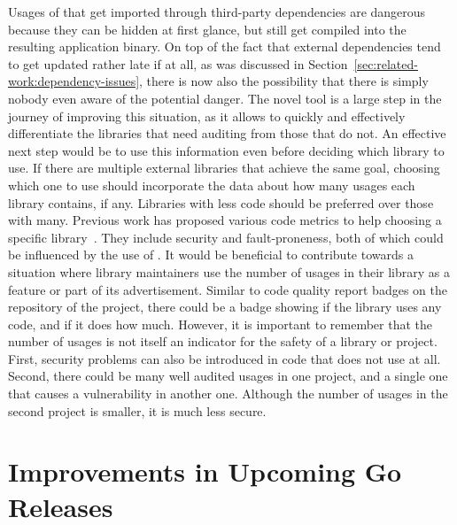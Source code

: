 Usages of \unsafe{} that get imported through third-party dependencies are dangerous because they can be hidden at first
glance, but still get compiled into the resulting application binary.
On top of the fact that external dependencies tend to get updated rather late if at all, as was discussed in
Section~\ref{sec:related-work:dependency-issues}, there is now also the possibility that there is simply nobody even
aware of the potential danger.
The novel tool \toolGeiger{} is a large step in the journey of improving this situation, as it allows to quickly and
effectively differentiate the libraries that need auditing from those that do not.
An effective next step would be to use this information even before deciding which library to use.
If there are multiple external libraries that achieve the same goal, choosing which one to use should incorporate the
data about how many \unsafe{} usages each library contains, if any.
Libraries with less \unsafe{} code should be preferred over those with many.
Previous work has proposed various code metrics to help choosing a specific library~\cite{delamora2018}.
They include security and fault-proneness, both of which could be influenced by the use of \unsafe{}.
It would be beneficial to contribute towards a situation where library maintainers use the number of \unsafe{} usages
in their library as a feature or part of its advertisement.
Similar to code quality report badges on the \github{} repository of the project, there could be a badge showing if the
library uses any \unsafe{} code, and if it does how much.
However, it is important to remember that the number of \unsafe{} usages is not itself an indicator for the safety of
a library or project.
First, security problems can also be introduced in code that does not use \unsafe{} at all.
Second, there could be many well audited \unsafe{} usages in one project, and a single one that causes a vulnerability
in another one.
Although the number of \unsafe{} usages in the second project is smaller, it is much less secure.



\section{Improvements in Upcoming Go Releases}\label{sec:discussion:changes-in-go}

